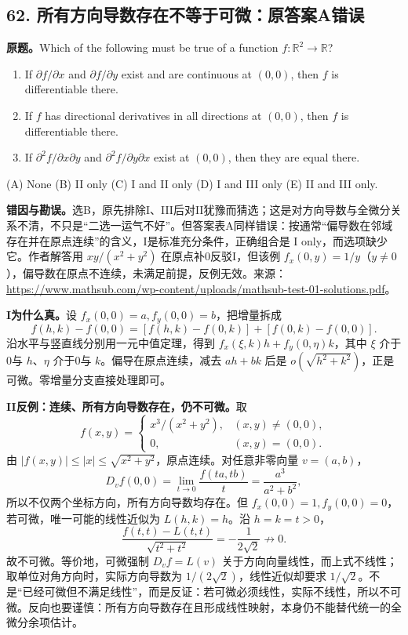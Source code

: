 \documentclass[11pt,a4paper,fontset=fandol]{ctexart}
\begin{document}
\subsection{62. 所有方向导数存在不等于可微：原答案A错误}
\label{ms:q62}
\textbf{原题。}Which of the following must be true of a function $f:\mathbb R^2\to\mathbb R$?
\begin{enumerate}[label=\Roman*.]
\item If $\partial f/\partial x$ and $\partial f/\partial y$ exist and are continuous at $(0,0)$, then $f$ is differentiable there.
\item If $f$ has directional derivatives in all directions at $(0,0)$, then $f$ is differentiable there.
\item If $\partial^2f/\partial x\partial y$ and $\partial^2f/\partial y\partial x$ exist at $(0,0)$, then they are equal there.
\end{enumerate}
(A) None \quad (B) II only \quad (C) I and II only \quad (D) I and III only \quad (E) II and III only.

\textbf{错因与勘误。}选B，原先排除I、III后对II犹豫而猜选；这是对方向导数与全微分关系不清，不只是“二选一运气不好”。但答案表A同样错误：按通常“偏导数在邻域存在并在原点连续”的含义，I是标准充分条件，正确组合是 I only，而选项缺少它。作者解答用 $xy/(x^2+y^2)$ 在原点补0反驳I，但该例 $f_x(0,y)=1/y$（$y\ne0$），偏导数在原点不连续，未满足前提，反例无效。来源：\url{https://www.mathsub.com/wp-content/uploads/mathsub-test-01-solutions.pdf}。

\textbf{I为什么真。}设 $f_x(0,0)=a,f_y(0,0)=b$，把增量拆成
\[
f(h,k)-f(0,0)=[f(h,k)-f(0,k)]+[f(0,k)-f(0,0)].
\]
沿水平与竖直线分别用一元中值定理，得到 $f_x(\xi,k)h+f_y(0,\eta)k$，其中 $\xi$ 介于0与 $h$、$\eta$ 介于0与 $k$。偏导在原点连续，减去 $ah+bk$ 后是 $o(\sqrt{h^2+k^2})$，正是可微。零增量分支直接处理即可。

\textbf{II反例：连续、所有方向导数存在，仍不可微。}取
\[
f(x,y)=\begin{cases}x^3/(x^2+y^2),&(x,y)\ne(0,0),\\0,&(x,y)=(0,0).\end{cases}
\]
由 $|f(x,y)|\le|x|\le\sqrt{x^2+y^2}$，原点连续。对任意非零向量 $v=(a,b)$，
\[
D_vf(0,0)=\lim_{t\to0}\frac{f(ta,tb)}t=\frac{a^3}{a^2+b^2},
\]
所以不仅两个坐标方向，所有方向导数均存在。但 $f_x(0,0)=1,f_y(0,0)=0$，若可微，唯一可能的线性近似为 $L(h,k)=h$。沿 $h=k=t>0$，
\[
\frac{f(t,t)-L(t,t)}{\sqrt{t^2+t^2}}=-\frac1{2\sqrt2}\not\to0.
\]
故不可微。等价地，可微强制 $D_vf=L(v)$ 关于方向向量线性，而上式不线性；取单位对角方向时，实际方向导数为 $1/(2\sqrt2)$，线性近似却要求 $1/\sqrt2$。不是“已经可微但不满足线性”，而是反证：若可微必须线性，实际不线性，所以不可微。反向也要谨慎：所有方向导数存在且形成线性映射，本身仍不能替代统一的全微分余项估计。
\end{document}
